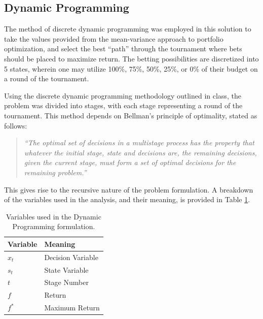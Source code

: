 \documentclass[12pt]{article}
\begin{document}
\subsection{Dynamic Programming}
The method of discrete dynamic programming was employed in this solution to take the values provided from the mean-variance approach to portfolio optimization, and select the best ``path'' through the tournament where bets should be placed to maximize return.
The betting possibilities are discretized into 5 states, wherein one may utilize 100\%, 75\%, 50\%, 25\%, or 0\% of their budget on a round of the tournament.

Using the discrete dynamic programming methodology outlined in class, the problem was divided into stages, with each stage representing a round of the tournament.
This method depends on Bellman's principle of optimality, stated as follows:
\begin{quote}
\emph{``The optimal set of decisions in a multistage process has the property that whatever the initial stage, state and decisions are, the remaining decisions, given the current stage, must form a set of optimal decisions for the remaining problem.''}\cite{rust1992people}
\end{quote}
This gives rise to the recursive nature of the problem formulation.
A breakdown of the variables used in the analysis, and their meaning, is provided in Table \ref{dp_vars}. \\

\begin{table}[htbp!]
\begin{centering}
    \begin{tabular}{|l|l|}
    \hline
    Variable & Meaning           \\ \hline
    $x_{t}$        & Decision Variable \\ \hline
    $s_{t}$        & State Variable    \\ \hline
    $t$        & Stage Number             \\ \hline
    $f$        & Return            \\ \hline
    $f^{*}$       & Maximum Return    \\ \hline
    \end{tabular}
    \label{dp_vars}
    \caption{Variables used in the Dynamic Programming formulation.}
\end{centering}
\end{table}
\end{document}
